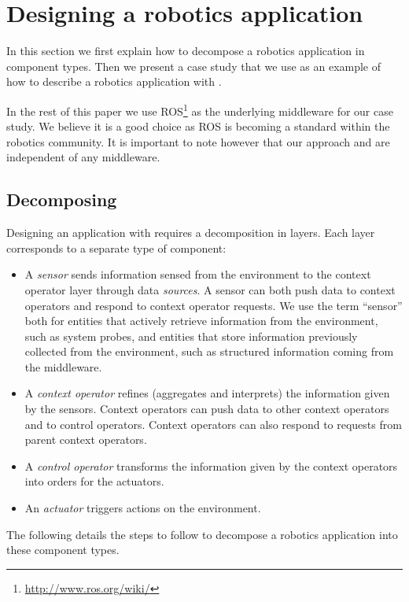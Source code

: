 \section{Designing a robotics application}
\label{sec:designing}

In this section we first explain how to decompose a robotics
application in \diaspec{} component types. Then we present a case
study that we use as an example of how to describe a robotics
application with \diaspec{}.

In the rest of this paper we use
ROS\footnote{\url{http://www.ros.org/wiki/}} as the underlying
middleware for our case study. We believe it is a good choice as ROS
is becoming a standard within the robotics community. It is important
to note however that our approach and \diaspec{} are independent of
any middleware.

\subsection{Decomposing}

Designing an application with \diaspec{} requires a decomposition in
layers. Each layer corresponds to a separate type of component:

\begin{itemize}
\item A \emph{sensor} sends information sensed from the environment to
  the context operator layer through data \emph{sources}. A sensor can
  both push data to context operators and respond to context operator
  requests. We use the term ``sensor'' both for entities that actively
  retrieve information from the environment, such as system probes,
  and entities that store information previously collected from the
  environment, such as structured information coming from the
  middleware.
\item A \emph{context operator} refines (aggregates and interprets)
  the information given by the sensors. Context operators can push
  data to other context operators and to control operators. Context
  operators can also respond to requests from parent context
  operators.
\item A \emph{control operator} transforms the information given by
  the context operators into orders for the actuators.
\item An \emph{actuator} triggers actions on the environment.
\end{itemize}

The following details the steps to follow to decompose a robotics
application into these component types.

